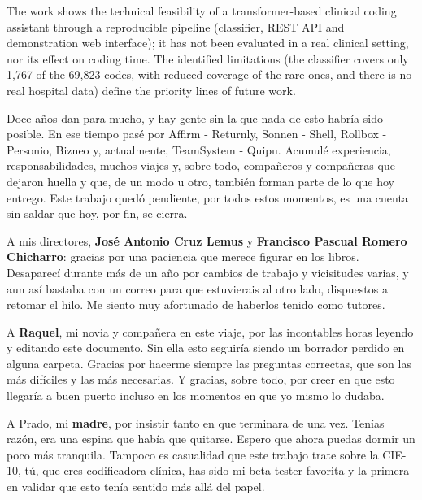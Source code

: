 \begin{resumenAlt}[english]{\tituloCortoAlt}
The work shows the technical feasibility of a transformer-based clinical coding assistant through a reproducible pipeline (classifier, REST API and demonstration web interface); it has not been evaluated in a real clinical setting, nor its effect on coding time. The identified limitations (the classifier covers only 1,767 of the 69,823 codes, with reduced coverage of the rare ones, and there is no real hospital data) define the priority lines of future work.
\end{resumenAlt}



Doce años dan para mucho, y hay gente sin la que nada de esto habría sido posible. En ese tiempo pasé por Affirm - Returnly, Sonnen - Shell, Rollbox - Personio, Bizneo y, actualmente, TeamSystem - Quipu. Acumulé experiencia, responsabilidades, muchos viajes y, sobre todo, compañeros y compañeras que dejaron huella y que, de un modo u otro, también forman parte de lo que hoy entrego. Este trabajo quedó pendiente, por todos estos momentos, es una cuenta sin saldar que hoy, por fin, se cierra.

A mis directores, \textbf{José Antonio Cruz Lemus} y \textbf{Francisco Pascual Romero Chicharro}: gracias por una paciencia que merece figurar en los libros. Desaparecí durante más de un año por cambios de trabajo y vicisitudes varias, y aun así bastaba con un correo para que estuvierais al otro lado, dispuestos a retomar el hilo. Me siento muy afortunado de haberlos tenido como tutores.

A \textbf{Raquel}, mi novia y compañera en este viaje, por las incontables horas leyendo y editando este documento. Sin ella esto seguiría siendo un borrador perdido en alguna carpeta. Gracias por hacerme siempre las preguntas correctas, que son las más difíciles y las más necesarias. Y gracias, sobre todo, por creer en que esto llegaría a buen puerto incluso en los momentos en que yo mismo lo dudaba.

A Prado, mi \textbf{madre}, por insistir tanto en que terminara de una vez. Tenías razón, era una espina que había que quitarse. Espero que ahora puedas dormir un poco más tranquila. Tampoco es casualidad que este trabajo trate sobre la CIE-10, tú, que eres codificadora clínica, has sido mi beta tester favorita y la primera en validar que esto tenía sentido más allá del papel.

